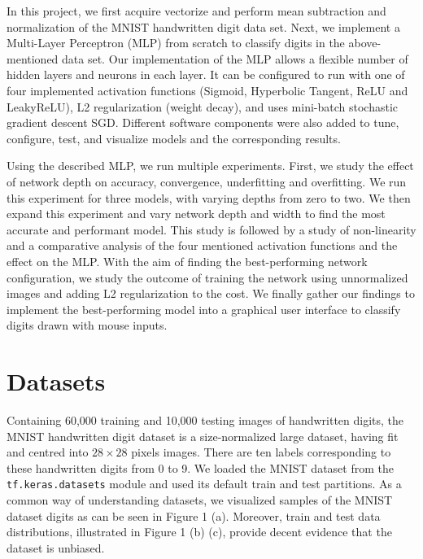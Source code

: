\documentclass[10pt]{article}
\begin{document}
In this project, we first acquire vectorize and perform mean subtraction and normalization of the MNIST handwritten digit data set. Next, we implement a Multi-Layer Perceptron (MLP) from scratch to classify digits in the above-mentioned data set. Our implementation of the MLP allows a flexible number of hidden layers and neurons in each layer. It can be configured to run with one of four implemented activation functions (Sigmoid, Hyperbolic Tangent, ReLU and LeakyReLU), L2 regularization (weight decay), and uses mini-batch stochastic gradient descent SGD. Different software components were also added to tune, configure, test, and visualize models and the corresponding results.

Using the described MLP, we run multiple experiments. First, we study the effect of network depth on accuracy, convergence, underfitting and overfitting. We run this experiment for three models, with varying depths from zero to two. We then expand this experiment and vary network depth and width to find the most accurate and performant model. This study is followed by a study of non-linearity and a comparative analysis of the four mentioned activation functions and the effect on the MLP. With the aim of finding the best-performing network configuration, we study the outcome of training the network using unnormalized images and adding L2 regularization to the cost.  We finally gather our findings to implement the best-performing model into a graphical user interface to classify digits drawn with mouse inputs.


\section{Datasets}
Containing 60,000 training and 10,000 testing images of handwritten digits, the MNIST handwritten digit dataset is a size-normalized large dataset, having fit and centred into $28\times 28$ pixels images. There are ten labels corresponding to these handwritten digits from 0 to 9. We loaded the MNIST dataset from the \verb+tf.keras.datasets+ module and used its default train and test partitions. As a common way of understanding datasets, we visualized samples of the MNIST dataset digits as can be seen in Figure 1 (a). Moreover, train and test data distributions, illustrated in Figure 1 (b) (c), provide decent evidence that the dataset is unbiased.
\end{document}

